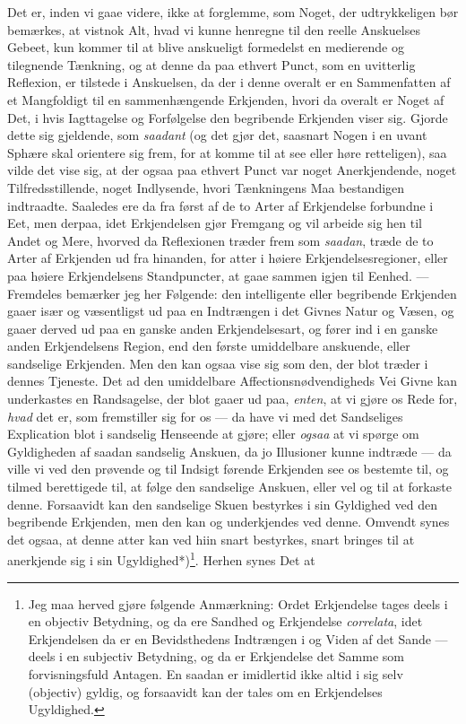 \documentclass[12pt,a4paper]{book}
\newcommand{\apage}[1]{\marginnote{\footnotesize\textit{[#1]}}}
\begin{document}
Det er, inden vi gaae videre, ikke at forglemme, som Noget, der
udtrykkeligen bør bemærkes, at vistnok Alt, hvad vi kunne henregne til den
reelle Anskuelses Gebeet, kun kommer til at blive anskueligt formedelst en
medierende og tilegnende Tænkning, og at denne da paa ethvert Punct, som en
uvitterlig Reflexion, er tilstede i Anskuelsen, da der i denne overalt er en
Sammenfatten af et Mangfoldigt til en sammenhængende Erkjenden, hvori da
overalt er Noget af Det, i hvis Iagttagelse og Forfølgelse den begribende
Erkjenden viser sig. Gjorde dette sig gjeldende, som \apage{105} \emph{saadant} (og det gjør det,
saasnart Nogen i en uvant Sphære skal orientere sig frem, for at komme til at
see eller høre retteligen), saa vilde det vise sig, at der ogsaa paa ethvert
Punct var noget Anerkjendende, noget Tilfredsstillende, noget Indlysende,
hvori Tænkningens Maa bestandigen indtraadte. Saaledes ere da fra først af de
to Arter af Erkjendelse forbundne i Eet, men derpaa, idet Erkjendelsen gjør
Fremgang og vil arbeide sig hen til Andet og Mere, hvorved da Reflexionen
træder frem som \emph{saadan}, træde de to Arter af Erkjenden ud fra hinanden, for
atter i høiere Erkjendelsesregioner, eller paa høiere Erkjendelsens
Standpuncter, at gaae sammen igjen til Eenhed. --- Fremdeles bemærker jeg her
Følgende: den intelligente eller begribende Erkjenden gaaer især og
væsentligst ud paa en Indtrængen i det Givnes Natur og Væsen, og gaaer derved
ud paa en ganske anden Erkjendelsesart, og fører ind i en ganske anden
Erkjendelsens Region, end den første umiddelbare anskuende, eller sandselige
Erkjenden. Men den kan ogsaa vise sig som den, der blot træder i dennes
Tjeneste. Det ad den umiddelbare Affectionsnødvendigheds Vei Givne kan
underkastes en Randsagelse, der blot gaaer ud paa, \emph{enten}, at vi gjøre os Rede
for, \emph{hvad} det er, som fremstiller sig for os --- da have vi med det
Sandseliges Explication blot i sandselig Henseende at gjøre; eller \emph{ogsaa} at vi
spørge om Gyldigheden af saadan sandselig Anskuen, da jo Illusioner kunne
indtræde --- da ville vi ved den prøvende og til Indsigt førende Erkjenden see
os bestemte til, og tilmed berettigede til, at følge den sandselige Anskuen,
eller vel og til at forkaste denne. Forsaavidt kan den sandselige Skuen
bestyrkes i sin Gyldighed ved den begribende Erkjenden, men den kan og
underkjendes ved denne. Omvendt synes det ogsaa, at denne atter kan ved hiin
snart bestyrkes, snart bringes til at anerkjende sig i sin
Ugyldighed*)\footnote{Jeg maa herved gjøre følgende Anmærkning: Ordet
Erkjendelse tages deels i en objectiv Betydning, og da ere Sandhed
og Erkjendelse \textit{correlata}, idet Erkjendelsen da er en Bevidsthedens
Indtrængen i og Viden af det Sande --- deels i en subjectiv
Betydning, og da er Erkjendelse det Samme som forvisningsfuld Antagen. En
saadan er imidlertid ikke altid i sig selv (objectiv) gyldig, og
forsaavidt kan der tales om en Erkjendelses Ugyldighed.}. \apage{106} Herhen synes Det at
\end{document}
